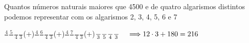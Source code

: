 \begin{ex}
Quantos números naturais maiores que 4500 e de quatro algarismos distintos podemos representar com os algarismos 2, 3, 4, 5, 6 e 7
  \begin{sol}
    \phantom{A}
     $\frac{4}{\phantom{A}}\frac{5}{\phantom{A}}\frac{\phantom{A}}{4}\frac{\phantom{A}}{3}$\hspace{0,4cm}(+)\hspace{0,4cm}$\frac{4}{\phantom{A}}\frac{6}{\phantom{A}}\frac{\phantom{A}}{4}\frac{\phantom{A}}{3}$\hspace{0,4cm}(+)\hspace{0,4cm}$\frac{4}{\phantom{A}}\frac{7}{\phantom{A}}\frac{\phantom{A}}{4}\frac{\phantom{A}}{3}$\hspace{0,4cm}(+)\hspace{0,4cm}$\frac{\phantom{A}}{3}\frac{\phantom{A}}{5}\frac{\phantom{A}}{4}\frac{\phantom{A}}{3}\hspace{0,4cm} \Longrightarrow 12\cdot3+180=216$ 
  \end{sol}
\end{ex}